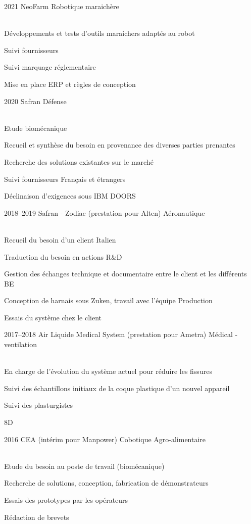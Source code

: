 \documentclass{cv-style}     %
\begin{document}
\begin{entrylist}
\entry
  {2021}
  {NeoFarm}
  {Robotique maraichère}
  {\\
   Développements et tests d'outils maraichers adaptés au robot

   Suivi fournisseurs

   Suivi marquage réglementaire

   Mise en place ERP et règles de conception
   }
 
\entry
  {2020}
  {Safran}
  {Défense}
  {\\
  Etude biomécanique

  Recueil et synthèse du besoin en provenance des diverses parties prenantes

  Recherche des solutions existantes sur le marché

  Suivi fournisseurs Français et étrangers

  Déclinaison d’exigences sous IBM DOORS 
  }
\entry
  {2018--2019}
  {Safran - Zodiac (prestation pour Alten)}
  {Aéronautique}
  {\\
  Recueil du besoin d'un client Italien

  Traduction du besoin en actions R\&D

  Gestion des échanges technique et documentaire entre le client et les différents BE

  Conception de harnais sous Zuken, travail avec l'équipe Production

  Essais du système chez le client
 
  }
\entry
 {2017--2018}
 {Air Liquide Medical System (prestation pour Ametra)}
 {Médical - ventilation}
 {\\
 En charge de l'évolution du système actuel pour réduire les fissures

 Suivi des échantillons initiaux de la coque plastique d'un nouvel appareil

 Suivi des plasturgistes

 8D
 }
\entry
 {2016}
 {CEA (intérim pour Manpower)}
 {Cobotique Agro-alimentaire}
 {\\
 Etude du besoin au poste de travail (biomécanique)

 Recherche de solutions, conception, fabrication de démonstrateurs

 Essais des prototypes par les opérateurs

 Rédaction de brevets
 }

\end{entrylist}
\end{document}
